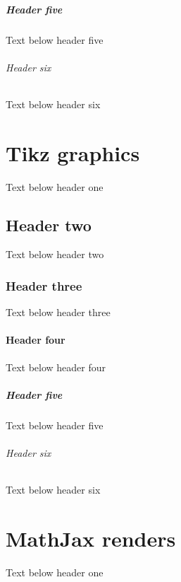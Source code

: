 \documentclass[a4paper,10pt,icelandic]{sphinxmanual}
\begin{document}
\paragraph{Header five}
\label{\detokenize{tables/index:header-five}}
\sphinxAtStartPar
Text below header five


\subparagraph{Header six}
\label{\detokenize{tables/index:header-six}}
\sphinxAtStartPar
Text below header six

\sphinxstepscope


\chapter{Tikz graphics}
\label{\detokenize{tikz-graphics/index:tikz-graphics}}\label{\detokenize{tikz-graphics/index::doc}}
\sphinxAtStartPar
Text below header one


\section{Header two}
\label{\detokenize{tikz-graphics/index:header-two}}
\sphinxAtStartPar
Text below header two


\subsection{Header three}
\label{\detokenize{tikz-graphics/index:header-three}}
\sphinxAtStartPar
Text below header three


\subsubsection{Header four}
\label{\detokenize{tikz-graphics/index:header-four}}
\sphinxAtStartPar
Text below header four


\paragraph{Header five}
\label{\detokenize{tikz-graphics/index:header-five}}
\sphinxAtStartPar
Text below header five


\subparagraph{Header six}
\label{\detokenize{tikz-graphics/index:header-six}}
\sphinxAtStartPar
Text below header six

\sphinxstepscope


\chapter{MathJax renders}
\label{\detokenize{mathjax-renders/index:mathjax-renders}}\label{\detokenize{mathjax-renders/index::doc}}
\sphinxAtStartPar
Text below header one
\end{document}
